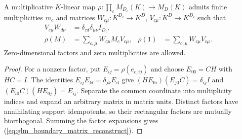\begin{lemma}
    \label{thm:glm_boundary_matrix_blocks}
    \leanok
    A multiplicative $K$-linear map
    $\rho:\prod_c M_{D_c}(K)\to M_D(K)$ admits finite multiplicities
    $m_c$ and matrices $W_{c\mu}:K^{D_c}\to K^D$,
    $V_{c\mu}:K^D\to K^{D_c}$ such that
    \begin{align}
        V_{c\mu}W_{d\nu}
                & =\delta_{cd}\delta_{\mu\nu}I_{D_c},
        \label{eq:glm_boundary_matrix_orthogonal}       \\
        \rho(M) & =\sum_{c,\mu}W_{c\mu}M_cV_{c\mu},   &
        \rho(1) & =\sum_{c,\mu}W_{c\mu}V_{c\mu}.
        \label{eq:glm_boundary_matrix_reconstruct}
    \end{align}
    Zero-dimensional factors and zero multiplicities are allowed.
\end{lemma}
\begin{proof}
    \leanok
    For a nonzero factor, put $E_{ij}=\rho(e_{c,ij})$ and choose
    $E_{00}=CH$ with $HC=I$. The identities
    $E_{ij}E_{kl}=\delta_{jk}E_{il}$ give
    $(HE_{0i})(E_{j0}C)=\delta_{ij}I$ and
    $(E_{i0}C)(HE_{0j})=E_{ij}$. Separate the common coordinate into
    multiplicity indices and expand an arbitrary matrix in matrix units.
    Distinct factors have annihilating support idempotents, so their
    rectangular factors are mutually biorthogonal. Summing the factor
    expansions gives (\ref{eq:glm_boundary_matrix_reconstruct}).
\end{proof}

